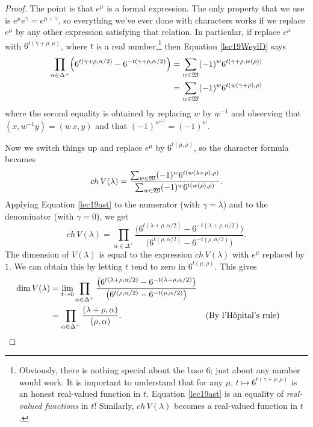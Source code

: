  \begin{proof}\newcommand\f{6}
   The point is that $e^\mu$ is a formal expression. The only property that we use is
   $e^\mu e^\gamma = e^{\mu+\gamma}$, so everything we've ever done with characters
   works if we replace $e^\mu$ by any other expression satisfying that relation. In
   particular, if replace $e^\mu$ with $\f^{t(\gamma+\rho,\mu)}$, where $t$ is a real
   number,\footnote{Obviously, there is nothing special about the base $\f$; just
   about any number would work. It is important to understand that for any $\mu$,
   $t\mapsto \f^{t(\gamma+\rho,\mu)}$ is an honest real-valued function in $t$.
   Equation \ref{lec19ast} is an equality of \emph{real-valued functions} in $t$! Similarly,
   $ch\, V(\lambda)$ becomes a real-valued function in $t$.} then
   Equation \ref{lec19WeylD} says
   \begin{align}
     \prod_{\alpha\in \Delta^+} \Bigl(\f^{t(\gamma+\rho,\alpha/2)} -
     \f^{-t(\gamma+\rho,\alpha/2)}\Bigr) &=
     \sum_{w\in \weyl}(-1)^w \f^{t(\gamma+\rho,w(\rho))}\notag\\
     &=\sum_{w\in \weyl}(-1)^w \f^{t(w(\gamma+\rho),\rho)} \label{lec19ast}
   \end{align}
   where the second equality is obtained by replacing $w$ by $w^{-1}$ and observing
   that $(x,w^{-1}y)=(w\,x,y)$ and that $(-1)^{w^{-1}}=(-1)^w$.

   Now we switch things up and replace $e^\mu$ by $\f^{t(\mu,\rho)}$, so the character
   formula becomes
   \[
     ch\, V(\lambda) =\frac{\sum_{w\in \weyl}(-1)^w
     \f^{t(w(\lambda+\rho),\rho)}}{\sum_{w\in \weyl}(-1)^w
     \f^{t(w(\rho),\rho)}}.
   \]
   Applying Equation \ref{lec19ast} to the numerator (with $\gamma=\lambda$) and to the
   denominator (with $\gamma=0$), we get
   \[
     ch\, V(\lambda) = \prod_{\alpha\in \Delta^+}
     \frac{\bigl(\f^{t(\lambda+\rho,\alpha/2)} -
     \f^{-t(\lambda+\rho,\alpha/2)}\bigr)}{\bigl(\f^{t(\rho,\alpha/2)} -
     \f^{-t(\rho,\alpha/2)}\bigr)}.
   \]
   The dimension of $V(\lambda)$ is equal to the expression $ch\, V(\lambda)$ with
   $e^\mu$ replaced by $1$. We can obtain this by letting $t$ tend to zero in
   $\f^{t(\mu,\rho)}$. This gives
   \begin{align*}
     \dim V(\lambda) &= \lim_{t\to 0}\prod_{\alpha\in \Delta^+}
     \frac{\bigl(\f^{t(\lambda+\rho,\alpha/2)} -
     \f^{-t(\lambda+\rho,\alpha/2)}\bigr)}{\bigl(\f^{t(\rho,\alpha/2)}
     - \f^{-t(\rho,\alpha/2)}\bigr)}\\
     &= \prod_{\alpha\in \Delta^+}\frac{(\lambda+\rho,\alpha)}{(\rho,\alpha)}. &
     \text{(By l'H\^{o}pital's rule)\qquad} \qedhere
   \end{align*}
 \end{proof}
